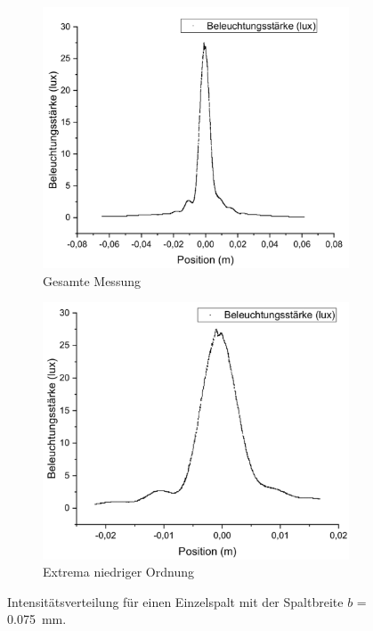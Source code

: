 \documentclass[
	a4paper,
	12pt,
	pagesize,
	ngerman
]{scrartcl}
\begin{document}
	\begin{figure}[H]
		\centering
		\begin{subfigure}{.5\textwidth}
			\centering
			\includegraphics[width=1\linewidth]{Einzelspalt0-075mm}
			\caption{Gesamte Messung}	
		\end{subfigure}%
		\begin{subfigure}{.5\textwidth}
			\centering
			\includegraphics[width=1\linewidth]{Einzelspalt0-075mmZOOM}
			\caption{Extrema niedriger Ordnung}
		\end{subfigure}
		\caption{Intensitätsverteilung für einen Einzelspalt mit der Spaltbreite $b$ = \SI{0,075}{mm}.}
		\label{Einzelspalt0-075mm}
	\end{figure}	
\end{document}
